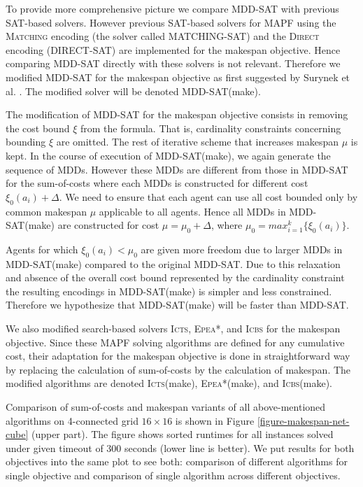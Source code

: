 \documentclass[jair,oneside,11pt]{article}
\begin{document}
To provide more comprehensive picture we compare MDD-SAT with previous SAT-based solvers. However previous SAT-based solvers for MAPF using the \textsc{Matching} encoding (the solver called MATCHING-SAT) \cite{DBLP:conf/ictai/Surynek14} and the \textsc{Direct} encoding (DIRECT-SAT) \cite{DBLP:conf/micai/Surynek14} are implemented for the makespan objective. Hence comparing MDD-SAT directly with these solvers is not relevant. Therefore we modified MDD-SAT for the makespan objective as first suggested by Surynek et al.  \citeyear{DBLP:conf/socs/SurynekFSB16}. The modified solver will be denoted MDD-SAT(make). 

The modification of MDD-SAT for the makespan objective consists in removing the cost bound $\xi$ from the formula. That is, cardinality constraints concerning bounding $\xi$ are omitted. The rest of iterative scheme that increases makespan $\mu$ is kept. In the course of execution of MDD-SAT(make), we again generate the sequence of MDDs. However these MDDs are different from those in MDD-SAT for the sum-of-costs where each MDDs is constructed for different cost $\xi_0(a_i) + \Delta$. We need to ensure that each agent can use all cost bounded only by common makespan $\mu$ applicable to all agents. Hence all MDDs in MDD-SAT(make) are constructed for cost $\mu=\mu_0 + \Delta$, where $\mu_0=max_{i=1}^k\{\xi_0(a_i)\}$.

Agents for which $\xi_0(a_i) < \mu_0$ are given more freedom due to larger MDDs in MDD-SAT(make) compared to the original MDD-SAT. Due to this relaxation and absence of the overall cost bound represented by the cardinality constraint the resulting encodings in MDD-SAT(make) is simpler and less constrained. Therefore we hypothesize that MDD-SAT(make) will be faster than MDD-SAT.

We also modified search-based solvers \textsc{Icts}, \textsc{Epea}*, and \textsc{Icbs} for the makespan objective. Since these MAPF solving algorithms are defined for any cumulative cost, their adaptation for the makespan objective is done in straightforward way by replacing the calculation of sum-of-costs by the calculation of makespan. The modified algorithms are denoted \textsc{Icts}(make), \textsc{Epea}*(make), and \textsc{Icbs}(make).

Comparison of sum-of-costs and makespan variants of all above-mentioned algorithms on 4-connected grid $16{}\times{}16$ is shown in Figure \ref{figure-makespan-net-cube} (upper part). The figure shows sorted runtimes for all instances solved under given timeout of 300 seconds (lower line is better). We put results for both objectives into the same plot to see both: comparison of different algorithms for single objective and comparison of single algorithm across different objectives.
\end{document}
